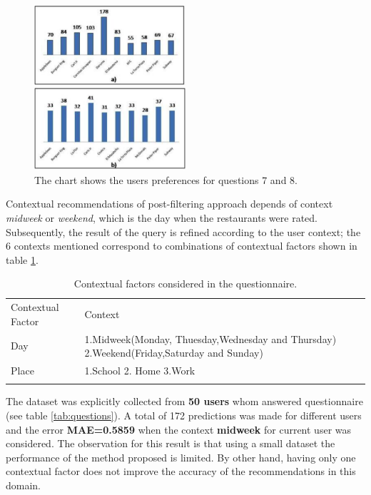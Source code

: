 \begin{figure}
\captionsetup{justification=centering,margin=2cm,font=footnotesize}
\centering
\setlength\fboxsep{0pt}
\includegraphics[width=0.5\textwidth]{img/bars.png}
\caption{The chart shows the users preferences for questions 7 and 8.}
\label{fig:barschart}     
\end{figure}
Contextual recommendations of post-filtering approach depends of
context \textit{midweek} or \textit{weekend}, which is the day when
the restaurants were rated. Subsequently, the result of the query is
refined according to the user context; the 6 contexts mentioned
correspond to combinations of contextual factors shown in table
\ref{tab:contextstijuana}.
\begin{table}
\small
\captionsetup{font=footnotesize}
\caption{Contextual factors considered in the questionnaire.}
\label{tab:contextstijuana} 
\centering
\small
\begin{tabular}{p{2.5cm} p{7cm} }
\hline\noalign{\smallskip}
Contextual Factor & Context \\
\noalign{\smallskip}\hline\noalign{\smallskip}
\small{Day} & \small{1.Midweek(Monday, Thuesday,Wednesday and Thursday) 
2.Weekend(Friday,Saturday and Sunday)}  \\ \hline 
\small{Place} & \small{1.School 2. Home 3.Work} \\ 
\noalign{\smallskip}\hline
\end{tabular}
\end{table}
The dataset was explicitly collected from \textbf{50 users} whom
answered questionnaire (see table \ref{tab:questions}). A total of 172
predictions was made for different users and the error
\textbf{MAE=0.5859} when the context \textbf{midweek} for current user
was considered. The observation for this result is that using a small
dataset the performance of the method proposed is limited. By other
hand, having only one contextual factor does not improve the accuracy
of the recommendations in this domain.

